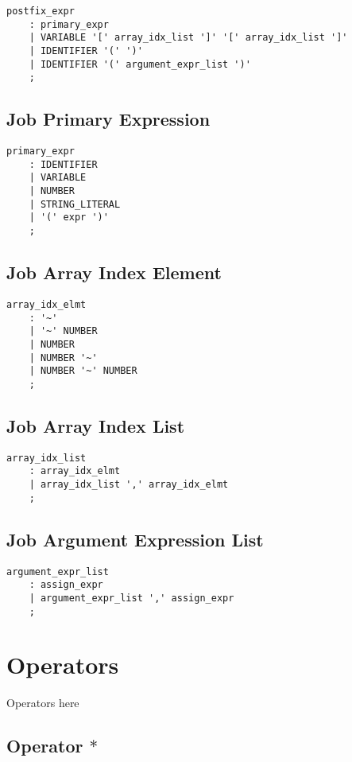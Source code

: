 \documentclass[prodmode,acmtecs]{acmsmall}
\begin{document}
\begin{lstlisting}
postfix_expr
	: primary_expr
	| VARIABLE '[' array_idx_list ']' '[' array_idx_list ']'
	| IDENTIFIER '(' ')'
	| IDENTIFIER '(' argument_expr_list ')'
	;
\end{lstlisting}

\subsection{Job Primary Expression}

\begin{lstlisting}
primary_expr
	: IDENTIFIER
	| VARIABLE
	| NUMBER
	| STRING_LITERAL
	| '(' expr ')'
	;
\end{lstlisting}

\subsection{Job Array Index Element}

\begin{lstlisting}
array_idx_elmt
	: '~'
	| '~' NUMBER
	| NUMBER
	| NUMBER '~'
	| NUMBER '~' NUMBER
	;
\end{lstlisting}

\subsection{Job Array Index List}

\begin{lstlisting}
array_idx_list
	: array_idx_elmt
	| array_idx_list ',' array_idx_elmt
	;
\end{lstlisting}
\subsection{Job Argument Expression List}

\begin{lstlisting}
argument_expr_list
	: assign_expr
	| argument_expr_list ',' assign_expr
	;
\end{lstlisting}

\section{Operators}
Operators here

\subsection{Operator $*$}
\end{document}
